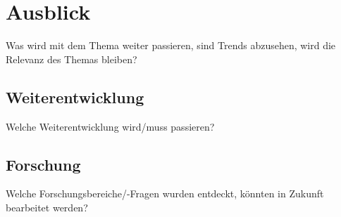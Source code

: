 \chapter{Ausblick}

Was wird mit dem Thema weiter passieren, sind Trends abzusehen, wird die Relevanz des Themas bleiben?

\section{Weiterentwicklung }\label{weiterentwicklung}
Welche Weiterentwicklung wird/muss passieren?

\section{Forschung}

Welche Forschungsbereiche/-Fragen wurden entdeckt, könnten in Zukunft bearbeitet werden?


